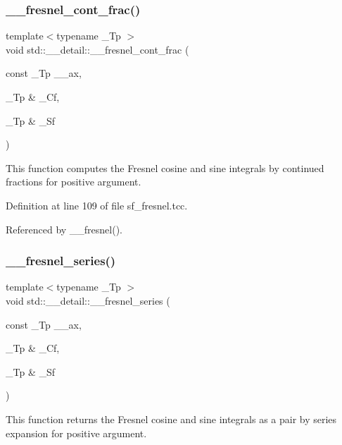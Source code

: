 \subsubsection{\texorpdfstring{\+\_\+\+\_\+fresnel\+\_\+cont\+\_\+frac()}{\_\_fresnel\_cont\_frac()}}
{\footnotesize\ttfamily template$<$typename \+\_\+\+Tp $>$ \\
void std\+::\+\_\+\+\_\+detail\+::\+\_\+\+\_\+fresnel\+\_\+cont\+\_\+frac (\begin{DoxyParamCaption}\item[{const \+\_\+\+Tp}]{\+\_\+\+\_\+ax,  }\item[{\+\_\+\+Tp \&}]{\+\_\+\+Cf,  }\item[{\+\_\+\+Tp \&}]{\+\_\+\+Sf }\end{DoxyParamCaption})}



This function computes the Fresnel cosine and sine integrals by continued fractions for positive argument. 



Definition at line 109 of file sf\+\_\+fresnel.\+tcc.



Referenced by \+\_\+\+\_\+fresnel().

\mbox{\label{namespacestd_1_1____detail_aae7775bc46d621e54fb9d994c2f35e2a}} 
\subsubsection{\texorpdfstring{\+\_\+\+\_\+fresnel\+\_\+series()}{\_\_fresnel\_series()}}
{\footnotesize\ttfamily template$<$typename \+\_\+\+Tp $>$ \\
void std\+::\+\_\+\+\_\+detail\+::\+\_\+\+\_\+fresnel\+\_\+series (\begin{DoxyParamCaption}\item[{const \+\_\+\+Tp}]{\+\_\+\+\_\+ax,  }\item[{\+\_\+\+Tp \&}]{\+\_\+\+Cf,  }\item[{\+\_\+\+Tp \&}]{\+\_\+\+Sf }\end{DoxyParamCaption})}



This function returns the Fresnel cosine and sine integrals as a pair by series expansion for positive argument. 



